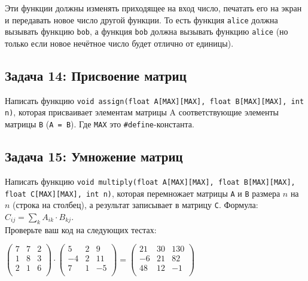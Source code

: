 \documentclass{article}
\begin{document}
Эти функции должны изменять приходящее на вход число, печатать его на экран и передавать новое число другой функции. То есть функция \texttt{alice} должна вызывать функцию \texttt{bob}, а функция \texttt{bob} должна вызывать функцию \texttt{alice} (но только если новое нечётное число будет отлично от единицы).


\subsection*{Задача 14: Присвоение матриц}
Написать функцию \texttt{void assign(float A[MAX][MAX], float B[MAX][MAX], int n)}, которая присваивает элементам матрицы A соответствующие элементы матрицы \texttt{B} (\texttt{A = B}). Где \texttt{MAX} это \texttt{\#define}-константа.


\subsection*{Задача 15: Умножение матриц}
Написать функцию \texttt{void multiply(float A[MAX][MAX], float B[MAX][MAX], float C[MAX][MAX], int n)}, которая перемножает матрицы \texttt{A} и \texttt{B} размера $n$ на $n$ (строка на столбец), а результат записывает в матрицу \texttt{C}. Формула: $C_{ij} = \sum\limits_k A_{ik} \cdot B_{kj}$. \\
Проверьте ваш код на следующих тестах:

\begin{center}
$\begin{pmatrix}
7 & 7 & 2 \\
1 & 8 & 3 \\
2 & 1 & 6 \\
\end{pmatrix} \cdot 
\begin{pmatrix}
5 & 2 & 9 \\
-4 & 2 & 11 \\
7 & 1 & -5 \\
\end{pmatrix}=
\begin{pmatrix}
21 & 30 & 130 \\
-6 & 21 & 82 \\
48 & 12 & -1 \\
\end{pmatrix}
$
\end{center}
\end{document}
